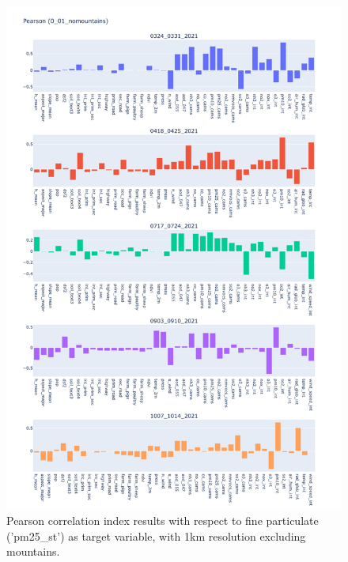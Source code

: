 \begin{figure}[H]
    \centering
    \includegraphics[scale=0.35]{images/tests/0_01_nomountainspm25_st_pearson.png}
    \caption{Pearson correlation index results with respect to fine particulate ('pm25\_st') as target variable, with 1km resolution excluding mountains.}
    \label{fig:overview}
\end{figure}



